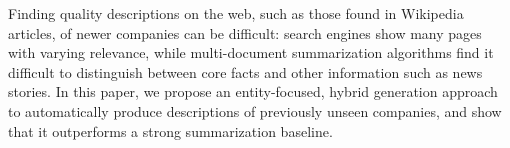 Finding quality descriptions on the web, such as those found in Wikipedia articles, of newer companies can be difficult: search engines show many pages with varying relevance, while multi-document summarization algorithms find it difficult to distinguish between core facts and other information such as news stories. In this paper, we propose an entity-focused, hybrid generation approach to automatically produce descriptions of previously unseen companies, and show that it outperforms a strong summarization baseline.
